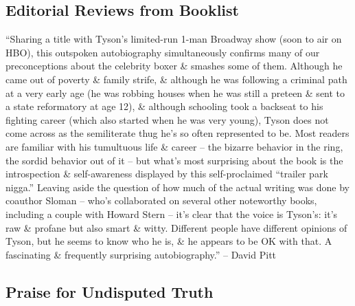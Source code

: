 \documentclass{article}
\numberwithin{equation}{section}
\begin{document}
\subsection{Editorial Reviews from Booklist}
``Sharing a title with Tyson's limited-run 1-man Broadway show (soon to air on HBO), this outspoken autobiography simultaneously confirms many of our preconceptions about the celebrity boxer \& smashes some of them. Although he came out of poverty \& family strife, \& although he was following a criminal path at a very early age (he was robbing houses when he was still a preteen \& sent to a state reformatory at age 12), \& although schooling took a backseat to his fighting career (which also started when he was very young), Tyson does not come across as the semiliterate thug he's so often represented to be. Most readers are familiar with his tumultuous life \& career -- the bizarre behavior in the ring, the sordid behavior out of it -- but what's most surprising about the book is the introspection \& self-awareness displayed by this self-proclaimed ``trailer park nigga.'' Leaving aside the question of how much of the actual writing was done by coauthor Sloman -- who's collaborated on several other noteworthy books, including a couple with Howard Stern -- it's clear that the voice is Tyson's: it's raw \& profane but also smart \& witty. Different people have different opinions of Tyson, but he seems to know who he is, \& he appears to be OK with that. A fascinating \& frequently surprising autobiography.'' -- David Pitt

\subsection{Praise for Undisputed Truth}
\end{document}
